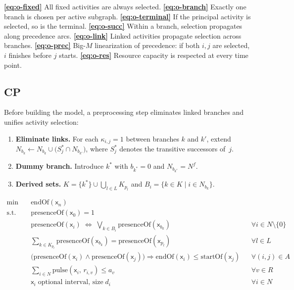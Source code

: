 \documentclass{article}
\begin{document}
\noindent
\textbf{\eqref{eq:o-fixed}} All fixed activities are always selected.
\textbf{\eqref{eq:o-branch}} Exactly one branch is chosen per active subgraph.
\textbf{\eqref{eq:o-terminal}} If the principal activity is selected, so is the terminal.
\textbf{\eqref{eq:o-succ}} Within a branch, selection propagates along precedence arcs.
\textbf{\eqref{eq:o-link}} Linked activities propagate selection across branches.
\textbf{\eqref{eq:o-prec}} Big-$M$ linearization of precedence: if both $i,j$ are selected, $i$ finishes before $j$ starts.
\textbf{\eqref{eq:o-res}} Resource capacity is respected at every time point.


\subsection{CP}

Before building the model, a preprocessing step eliminates linked branches and unifies activity selection:
%
\begin{enumerate}
    \item \textbf{Eliminate links.} For each $\kappa_{i,j} = 1$ between branches $k$ and $k'$, extend $N_{b_k} \leftarrow N_{b_k} \cup \bigl(S^*_j \cap N_{b_{k'}}\bigr)$, where $S^*_j$ denotes the transitive successors of~$j$.
    \item \textbf{Dummy branch.} Introduce $k^*$ with $b_{k^*} = 0$ and $N_{b_{k^*}} = N^f$.
    \item \textbf{Derived sets.} $K = \{k^*\} \cup \bigcup_{l \in L} K_{p_l}$ \;\; and \;\; $B_i = \{k \in K \mid i \in N_{b_k}\}$.
\end{enumerate}

\begin{align}
\min \quad & \mathrm{endOf}(\mathsf{x}_n) \label{eq:ocp-obj} \\[2mm]
\text{s.t.} \quad
& \mathrm{presenceOf}(\mathsf{x}_0) = 1
    \label{eq:ocp-source} \\
& \mathrm{presenceOf}(\mathsf{x}_i) \;\Leftrightarrow\; \bigvee_{k \in B_i} \mathrm{presenceOf}(\mathsf{x}_{b_k})
    && \forall i \in N \!\setminus\! \{0\} \label{eq:ocp-sel} \\
& \sum_{k \in K_{p_l}} \mathrm{presenceOf}(\mathsf{x}_{b_k}) = \mathrm{presenceOf}(\mathsf{x}_{p_l})
    && \forall l \in L \label{eq:ocp-branch} \\
& \bigl(\mathrm{presenceOf}(\mathsf{x}_i) \!\wedge\! \mathrm{presenceOf}(\mathsf{x}_j)\bigr) \Rightarrow \mathrm{endOf}(\mathsf{x}_i) \le \mathrm{startOf}(\mathsf{x}_j)
    && \forall (i,j) \!\in\! A \label{eq:ocp-prec} \\
& \sum_{i \in N} \mathrm{pulse}(\mathsf{x}_i,\, r_{i,v}) \le a_v
    && \forall v \in R \label{eq:ocp-res} \\
& \mathsf{x}_i \;\text{optional interval, size}\; d_i
    && \forall i \in N \label{eq:ocp-var}
\end{align}
\end{document}
